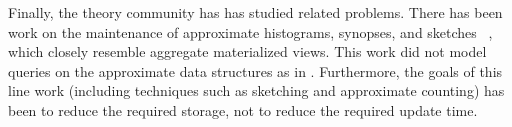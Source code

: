 
Finally, the theory community has has studied related problems.
There has been work on the maintenance of approximate histograms, synopses, and sketches ~\cite{gibbons1997fast, DBLP:journals/ftdb/CormodeGHJ12}, which closely resemble aggregate materialized views.
This work did not model queries on the approximate data structures as in \svc.
Furthermore, the goals of this line work (including techniques such as sketching and approximate counting) has been to reduce the required storage, not to reduce the required update time.
\vspace{-1em}
